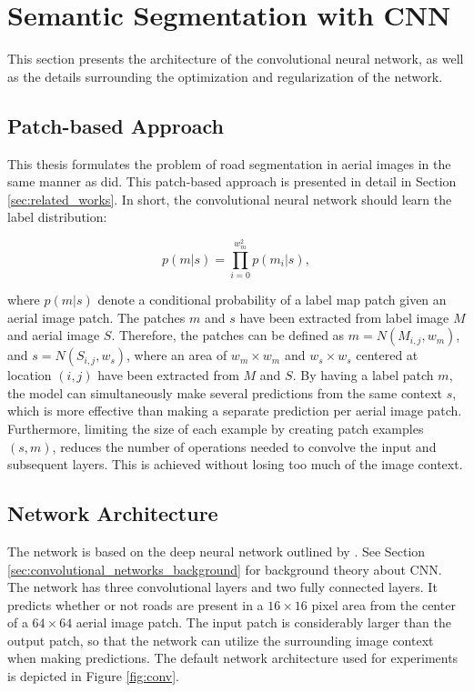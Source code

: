 \section{Semantic Segmentation with CNN}
\label{sec:network}
This section presents the architecture of the convolutional neural network, as well as the details surrounding the optimization and regularization of the network. 

\subsection{Patch-based Approach}
This thesis formulates the problem of road segmentation in aerial images in the same manner as \cite{Mnih_roads_high_res_aerial_images} did. This patch-based approach is presented in detail in Section \ref{sec:related_works}. In short, the convolutional neural network should learn the label distribution:

$$ p(m|s) = \prod_{i=0}^{w_m^2}p(m_i | s),  $$

\noindent where $p(m|s)$ denote a conditional probability of a label map patch given an aerial image patch. The patches $m$ and $s$ have been extracted from label image $M$ and aerial image $S$. Therefore, the patches can be defined as $m =N(M_{i,j}, w_m)$, and $ s = N(S_{i,j}, w_s)$, where an area of $w_m \times w_m$ and $w_s \times w_s$ centered at location $(i, j)$ have been extracted from $M$ and $S$. By having a label patch $m$, the model can simultaneously make several predictions from the same context $s$, which is more effective than making a separate prediction per aerial image patch. Furthermore, limiting the size of each example by creating patch examples $(s, m)$, reduces the number of operations needed to convolve the input and subsequent layers. This is achieved without losing too much of the image context. \\ 


\subsection{Network Architecture}
The network is based on the deep neural network outlined by \cite{MnihThesis}. See Section \ref{sec:convolutional_networks_background} for background theory about \ac{CNN}. The network has three convolutional layers and two fully connected layers. It predicts whether or not roads are present in a $16 \times 16$ pixel area from the center of  a $64 \times 64$ aerial image patch. The input patch is considerably larger than the output patch, so that the network can utilize the surrounding image context when making predictions. The default network architecture used for experiments is depicted in Figure \ref{fig:conv}. \\

